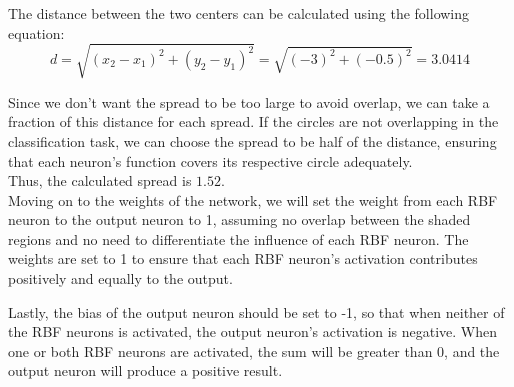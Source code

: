The distance between the two centers can be calculated using the following equation:
\[
d = \sqrt{\left(x_2 - x_1\right)^2 + \left(y	_2 - y_1\right)^2 } = \sqrt{\left(-3\right)^2 + \left(-0.5\right)^2 } = 3.0414
\]

Since we don't want the spread to be too large to avoid overlap, we can take a fraction of this distance for each spread. If the circles are not overlapping in the classification task, we can choose the spread to be half of the distance, ensuring that each neuron's function covers its respective circle adequately.\\
Thus, the calculated spread is $1.52$.\\

Moving on to the weights of the network, we will set the weight from each RBF neuron to the output neuron to 1, assuming no overlap between the shaded regions and no need to differentiate the influence of each RBF neuron.
The weights are set to 1 to ensure that each RBF neuron's activation contributes positively and equally to the output.

Lastly, the bias of the output neuron should be set to -1, so that when neither of the RBF neurons is activated, the output neuron's activation is negative. When one or both RBF neurons are activated, the sum will be greater than 0, and the output neuron will produce a positive result.
\vspace{3mm}